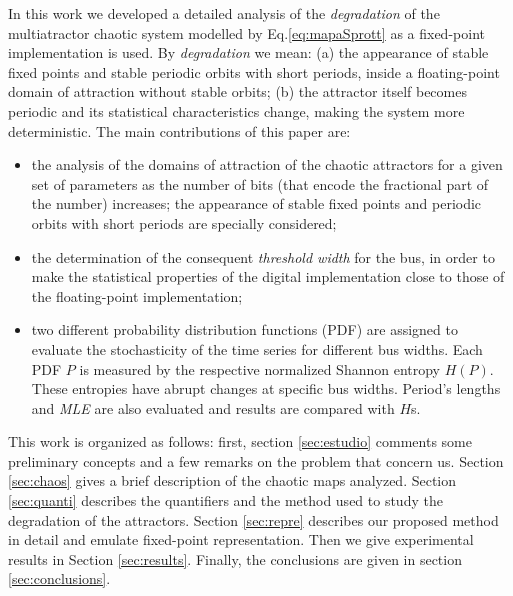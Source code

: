 In this work we developed a detailed analysis of the
\textsl{degradation} of the multiatractor chaotic system modelled
by Eq.\ref{eq:mapaSprott} as a fixed-point implementation is used. By
\textsl{degradation} we mean: (a) the appearance of stable fixed
points and stable periodic orbits with short periods, inside a
floating-point domain of attraction without stable orbits; (b) the
attractor itself becomes periodic and its statistical
characteristics change, making the system more deterministic. The main contributions of this paper are: 
\begin{itemize}
\item the analysis of the domains of
attraction of the chaotic attractors for a given set of parameters
as the number of bits (that encode the fractional part of the number)
increases; the appearance of stable fixed points and periodic
orbits with short periods are specially considered;
\item the  determination of the consequent \textsl{threshold width} for the bus, in order to make the  statistical
 properties of the digital implementation close to those of the floating-point implementation; 
\item  two different probability distribution functions (PDF) are assigned  to evaluate the stochasticity of the time series for different bus widths. Each PDF  $P$ is measured by the respective normalized Shannon entropy $H(P)$. These entropies have abrupt changes at specific bus widths. Period's lengths and \textsl{MLE} are also evaluated and results are compared with $H$s.
\end{itemize}
This work is organized as follows: first, section \ref{sec:estudio} comments some preliminary concepts and a few remarks on the problem that concern us. Section \ref{sec:chaos} gives a
brief description of the chaotic maps analyzed. Section \ref{sec:quanti} describes the quantifiers and the method used to study the degradation of the attractors. Section \ref{sec:repre} describes our proposed method in detail and emulate fixed-point representation. Then we give experimental results
in Section \ref{sec:results}. Finally, the conclusions are given in section \ref{sec:conclusions}.
